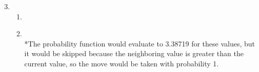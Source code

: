 \documentclass{article}
\begin{document}
\fancyhfoffset[L]{0cm}
\fancyhfoffset[R]{0cm}

\begin{enumerate}
    \setcounter{enumi}{2}
    \item
    \begin{enumerate}
        \item

        \item \textcolor{white}{.}\vspace{-12pt}\\%
            *The probability function would evaluate to 3.38719 for these values, but it would be skipped because the neighboring value is greater than the current value, so the move would be taken with probability 1.
    \end{enumerate}
\end{enumerate}
\end{document}

